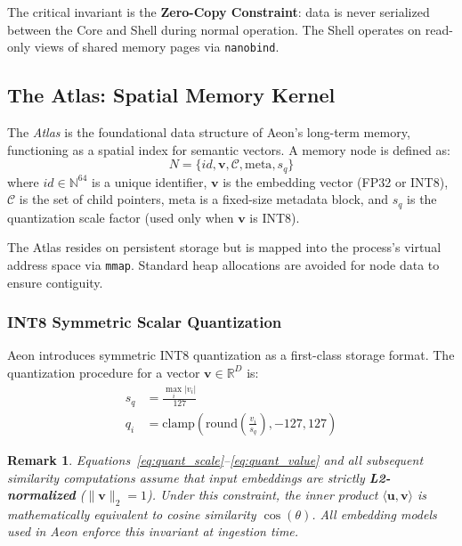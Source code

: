 \documentclass[10pt,twocolumn]{article}
\begin{document}
The critical invariant is the \textbf{Zero-Copy Constraint}: data is never serialized between the Core and Shell during normal operation. The Shell operates on read-only views of shared memory pages via \texttt{nanobind}.

\subsection{The Atlas: Spatial Memory Kernel}
The \textit{Atlas} is the foundational data structure of Aeon's long-term memory, functioning as a spatial index for semantic vectors. A memory node is defined as:
\begin{equation}
    N = \{id, \mathbf{v}, \mathcal{C}, \text{meta}, s_q\}
\end{equation}
where $id \in \mathbb{N}^{64}$ is a unique identifier, $\mathbf{v}$ is the embedding vector (FP32 or INT8), $\mathcal{C}$ is the set of child pointers, $\text{meta}$ is a fixed-size metadata block, and $s_q$ is the quantization scale factor (used only when $\mathbf{v}$ is INT8).

The Atlas resides on persistent storage but is mapped into the process's virtual address space via \texttt{mmap}. Standard heap allocations are avoided for node data to ensure contiguity.

\subsubsection{INT8 Symmetric Scalar Quantization}
\label{subsec:int8_quantization}
Aeon introduces symmetric INT8 quantization as a first-class storage format. The quantization procedure for a vector $\mathbf{v} \in \mathbb{R}^{D}$ is:
\begin{align}
    s_q &= \frac{\max_i |v_i|}{127} \label{eq:quant_scale} \\
    q_i &= \text{clamp}\left(\text{round}\left(\frac{v_i}{s_q}\right), -127, 127\right) \label{eq:quant_value}
\end{align}

\newtheorem{remark}{Remark}
\begin{remark}
Equations~\eqref{eq:quant_scale}--\eqref{eq:quant_value} and all subsequent
similarity computations assume that input embeddings are strictly
\textbf{L2-normalized} ($\|\mathbf{v}\|_2 = 1$). Under this constraint, the
inner product $\langle \mathbf{u}, \mathbf{v} \rangle$ is mathematically
equivalent to cosine similarity $\cos(\theta)$. All embedding models used in
Aeon enforce this invariant at ingestion time.
\end{remark}
\end{document}
